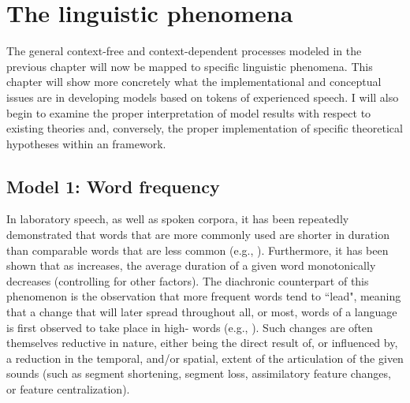 \chapter{The linguistic phenomena}\label{ch:The-Linguistic-Phenomena}

The general context-free and context-dependent processes modeled in
the previous chapter will now be mapped to specific linguistic phenomena.
This chapter will show more concretely what the implementational and
conceptual issues are in developing  models based on tokens
of experienced speech. I will also begin to examine the proper interpretation
of model results with respect to existing theories and, conversely,
the proper implementation of specific theoretical hypotheses within
an  framework. 

\section{\label{subsec:Word-Frequency}Model 1: Word frequency}

In laboratory speech, as well as spoken corpora, it has been repeatedly
demonstrated that words that are more commonly used are shorter in
duration than comparable words that are less common (e.g., \citealt{Bybee2001,Bybee2002,Bybee2006}).
Furthermore, it has been shown that as  increases, the average
duration of a given word monotonically decreases (controlling for
other factors). The diachronic counterpart of this phenomenon is the
observation that more frequent words tend to “lead",
meaning that a change that will later spread throughout all, or most,
words of a language is first observed to take place in high-
words (e.g., \citealt{Phillips1984}). Such changes are often themselves
reductive in nature, either being the direct result of, or influenced
by, a reduction in the temporal, and/or spatial, extent of the articulation
of the given sounds (such as segment shortening, segment loss, assimilatory
feature changes, or feature centralization).

